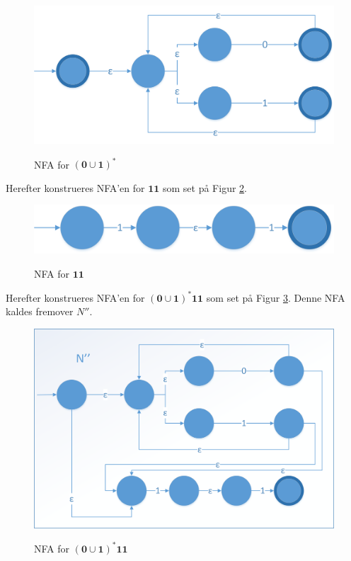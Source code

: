 \documentclass[a4paper,10pt,article]{memoir}
\begin{document}
\begin{eksempel}
\begin{figure}[H]%
{\centering 
\includegraphics[width=\textwidth]{Fig12x.png}
} \caption{NFA for $\mathbf{(0\cup1)^*}$}
\label{fig:fig12}
\end{figure}

Herefter konstrueres NFA'en for $\mathbf{11}$ som set på Figur \ref{fig:fig13}.

\begin{figure}[H]%
{\centering 
\includegraphics[width=\textwidth]{Fig13x.png}
} \caption{NFA for $\mathbf{11}$}
\label{fig:fig13}
\end{figure}

Herefter konstrueres NFA'en for $\mathbf{(0\cup1)^*11}$ som set på
Figur \ref{fig:fig14}. Denne NFA kaldes fremover $N''$.

\begin{figure}[H]%
{\centering 
\includegraphics[width=\textwidth]{Fig14x.png}
} \caption{NFA for $\mathbf{(0\cup1)^*11}$}
\label{fig:fig14}
\end{figure}


\end{eksempel}
\end{document}
